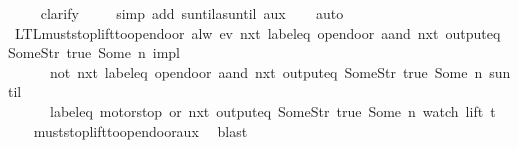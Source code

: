 \begin{isabellebody}
\ \ \ \isamarkupfalse%
\ clarify\isanewline
\ \ \ \isamarkupfalse%
\ {\isacharparenleft}simp\ add{\isacharcolon}\ suntil{\isacharunderscore}as{\isacharunderscore}until\ aux{\isacharparenright}\isanewline
\ \ \isamarkupfalse%
\ auto%
\endisatagproof
{\isafoldproof}%
%
\isadelimproof
\isanewline
%
\endisadelimproof
\isanewline
{}\isamarkupfalse%
\ LTL{\isacharunderscore}must{\isacharunderscore}stop{\isacharunderscore}lift{\isacharunderscore}to{\isacharunderscore}open{\isacharunderscore}door{\isacharcolon}\ {\isachardoublequoteopen}alw\ {\isacharparenleft}{\isacharparenleft}ev\ {\isacharparenleft}nxt\ {\isacharparenleft}{\isacharparenleft}label{\isacharunderscore}eq\ {\isacharprime}{\isacharprime}opendoor{\isacharprime}{\isacharprime}{\isacharparenright}\ aand\ {\isacharparenleft}nxt\ {\isacharparenleft}output{\isacharunderscore}eq\ {\isacharbrackleft}Some{\isacharparenleft}Str\ {\isacharprime}{\isacharprime}true{\isacharprime}{\isacharprime}{\isacharparenright}{\isacharcomma}\ Some\ n{\isacharbrackright}{\isacharparenright}{\isacharparenright}{\isacharparenright}{\isacharparenright}{\isacharparenright}\ impl\isanewline
\ \ \ \ \ \ {\isacharparenleft}{\isacharparenleft}not\ {\isacharparenleft}nxt\ {\isacharparenleft}{\isacharparenleft}label{\isacharunderscore}eq\ {\isacharprime}{\isacharprime}opendoor{\isacharprime}{\isacharprime}{\isacharparenright}\ aand\ {\isacharparenleft}nxt\ {\isacharparenleft}output{\isacharunderscore}eq\ {\isacharbrackleft}Some{\isacharparenleft}Str\ {\isacharprime}{\isacharprime}true{\isacharprime}{\isacharprime}{\isacharparenright}{\isacharcomma}\ Some\ n{\isacharbrackright}{\isacharparenright}{\isacharparenright}{\isacharparenright}{\isacharparenright}{\isacharparenright}\ suntil\isanewline
\ \ \ \ \ \ {\isacharparenleft}{\isacharparenleft}{\isacharparenleft}label{\isacharunderscore}eq\ {\isacharprime}{\isacharprime}motorstop{\isacharprime}{\isacharprime}{\isacharparenright}\ or\ {\isacharparenleft}nxt\ {\isacharparenleft}output{\isacharunderscore}eq\ {\isacharbrackleft}Some{\isacharparenleft}Str\ {\isacharprime}{\isacharprime}true{\isacharprime}{\isacharprime}{\isacharparenright}{\isacharcomma}\ Some\ n{\isacharbrackright}{\isacharparenright}{\isacharparenright}{\isacharparenright}{\isacharparenright}{\isacharparenright}{\isacharparenright}\ {\isacharparenleft}watch\ lift\ t{\isacharparenright}{\isachardoublequoteclose}\isanewline
%
\isadelimproof
\ \ %
\endisadelimproof
%
\isatagproof
{}\isamarkupfalse%
\ must{\isacharunderscore}stop{\isacharunderscore}lift{\isacharunderscore}to{\isacharunderscore}open{\isacharunderscore}door{\isacharunderscore}aux\ \isamarkupfalse%
\ blast%
\endisatagproof
{\isafoldproof}%
%
\isadelimproof
\isanewline
%
\endisadelimproof
%
\isadelimtheory
\isanewline
%
\endisadelimtheory
%
\isatagtheory
{}\isamarkupfalse%
%
\endisatagtheory
{\isafoldtheory}%
%
\isadelimtheory
%
\endisadelimtheory
%
\end{isabellebody}%
